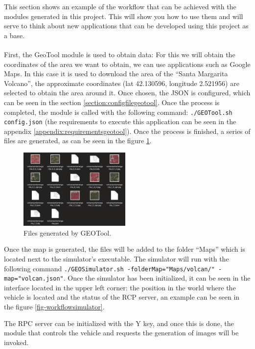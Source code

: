 \documentclass[10pt,a4paper,twocolumn,twoside]{article}
\begin{document}
This section shows an example of the workflow that can be achieved with the modules generated in this project. This will show you how to use them and will serve to think about new applications that can be developed using this project as a base.
\\
\\
First, the GeoTool module is used to obtain data: For this we will obtain the coordinates of the area we want to obtain, we can use applications such as Google Maps. In this case it is used to download the area of the ``Santa Margarita Volcano'', the approximate coordinates (lat 42.130596, longitude 2.521956) are selected to obtain the area around it. Once chosen, the JSON is configured, which can be seen in the section \ref{section:configfilegeotool}. Once the process is completed, the module is called with the following command: \texttt{./GEOTool.sh config.json} (the requirements to execute this application can be seen in the appendix \ref{appendix:requirementsgeotool}). Once the process is finished, a series of files are generated, as can be seen in the figure \ref{fig-filesgeotool}.

\begin{figure}[h]
\centering
  	\includegraphics[width=0.49\textwidth]{filesgeotool}
	\caption{Files generated by GEOTool.}
	\label{fig-filesgeotool}
\end{figure}

Once the map is generated, the files will be added to the folder ``Maps'' which is located next to the simulator's executable. The simulator will run with the following command \texttt{./GEOSimulator.sh -folderMap="Maps/volcan/" -map="volcan.json"}. Once the simulator has been initialized, it can be seen in the interface located in the upper left corner: the position in the world where the vehicle is located and the status of the RCP server, an example can be seen in the figure \ref{fig-workflowsimulator}.

The RPC server can be initialized with the Y key, and once this is done, the module that controls the vehicle and requests the generation of images will be invoked.
\end{document}
